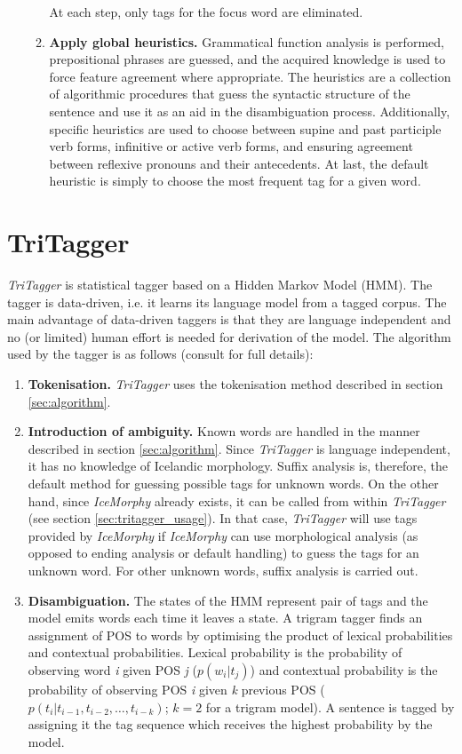 \documentclass[11pt]{article}
\begin{document}
\begin{enumerate}
\begin{enumerate}
At each step, only tags for the focus word are eliminated.
\item {\bf Apply global heuristics.}
Grammatical function analysis is performed, prepositional phrases are guessed, and the acquired knowledge is used to force feature agreement where appropriate. The heuristics are a collection of algorithmic procedures that guess the syntactic structure of the sentence and use it as an aid in the disambiguation process.
Additionally, specific heuristics are used to choose between supine and past participle verb forms, infinitive or active verb forms, and ensuring agreement between reflexive pronouns and their antecedents.
At last, the default heuristic is simply to choose the most frequent tag for a given word.
\end{enumerate}
\end{enumerate}

\section{TriTagger}
\emph{TriTagger} is statistical tagger based on a Hidden Markov Model (HMM).
The tagger is data-driven, i.e. it learns its language model from a tagged corpus.
The main advantage of data-driven taggers is that they are language independent and no (or limited) human effort is needed for derivation of the model.
The algorithm used by the tagger is as follows (consult \citep{bra00} for full details):

\begin{enumerate}
\item {\bf Tokenisation.}
\emph{TriTagger} uses the tokenisation method described in section \ref{sec:algorithm}.
\item {\bf Introduction of ambiguity.}
Known words are handled in the manner described in section \ref{sec:algorithm}.
Since \emph{TriTagger} is language independent, it has no knowledge of Icelandic morphology.
Suffix analysis is, therefore, the default method for guessing possible tags for unknown words.
On the other hand, since \emph{IceMorphy} already exists, it can be called from within \emph{TriTagger} (see section \ref{sec:tritagger_usage}).
In that case, \emph{TriTagger} will use tags provided by \emph{IceMorphy} if \emph{IceMorphy} can use morphological analysis (as opposed to ending analysis or default handling) to guess the tags for an unknown word.
For other unknown words, suffix analysis is carried out.
\item {\bf Disambiguation.}
The states of the HMM represent pair of tags and the model emits words each time it leaves a state. A trigram tagger finds an assignment of POS to words by optimising the product of lexical probabilities and contextual probabilities.
Lexical probability is the probability of observing word \emph{i} given POS \emph{j} ($p(w_{i}|t_{j})$) and contextual probability is the probability of observing POS \emph{i} given \emph{k} previous POS ($p(t_{i}|t_{i-1},t_{i-2}, \ldots ,t_{i-k})$; $k=2$ for a trigram model).
A sentence is tagged by assigning it the tag sequence which receives the highest probability by the model.
\end{enumerate}
\end{document}
